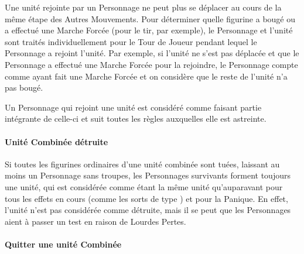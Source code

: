 Une unité rejointe par un Personnage ne peut plus se déplacer au cours de la même étape des Autres Mouvements. Pour déterminer quelle figurine a bougé ou a effectué une Marche Forcée (pour le tir, par exemple), le Personnage et l'unité sont traités individuellement pour le Tour de Joueur pendant lequel le Personnage a rejoint l'unité. Par exemple, si l'unité ne s'est pas déplacée et que le Personnage a effectué une Marche Forcée pour la rejoindre, le Personnage compte comme ayant fait une Marche Forcée et on considère que le reste de l'unité n'a pas bougé.

Un Personnage qui rejoint une unité est considéré comme faisant partie intégrante de celle-ci et suit toutes les règles auxquelles elle est astreinte.

\paragraph{Unité Combinée détruite}

Si toutes les figurines ordinaires d'une unité combinée sont tuées, laissant au moins un Personnage sans troupes, les Personnages survivants forment toujours une unité, qui est considérée comme étant la même unité qu'auparavant pour tous les effets en cours (comme les sorts de type \lastsoneturn{}) et pour la Panique. En effet, l'unité n'est pas considérée comme détruite, mais il se peut que les Personnages aient à passer un test en raison de Lourdes Pertes.

\newpage
\paragraph{Quitter une unité Combinée}
\label{leaving_a_combined_unit}

